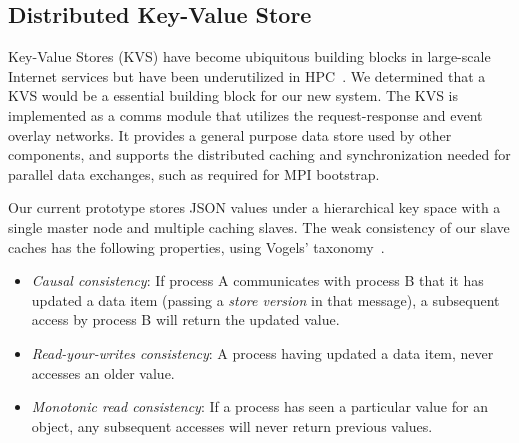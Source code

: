 \subsection{Distributed Key-Value Store}

Key-Value Stores (KVS) have become ubiquitous building blocks in large-scale
Internet services but have been underutilized in HPC~\cite{Wang:2013:USE:2503210.2503239}.
We determined that a KVS would be a
essential building block for our new system.
The \flux KVS is implemented as a comms module that utilizes the
request-response and event overlay networks.  It provides a general
purpose data store used by other \flux components, and supports
the distributed caching and synchronization needed for parallel
data exchanges, such as required for MPI bootstrap.

%
%
Our current prototype stores JSON values under a hierarchical key space
with a single master node and multiple caching slaves.  The weak consistency
of our slave caches has the following properties, using Vogels'
taxonomy~\cite{Vogels:2009:EC:1435417.1435432}.

\begin{itemize}
\item{{\em Causal consistency}:  If process A communicates with process B
that it has updated a data item (passing a {\em store version} in that
message), a subsequent access by process B will return the updated value.}
\item{{\em Read-your-writes consistency}:  A process having updated a
data item, never accesses an older value.}
\item{{\em Monotonic read consistency}:  If a process has seen a particular
value for an object, any subsequent accesses will never return previous values.}
\end{itemize}

